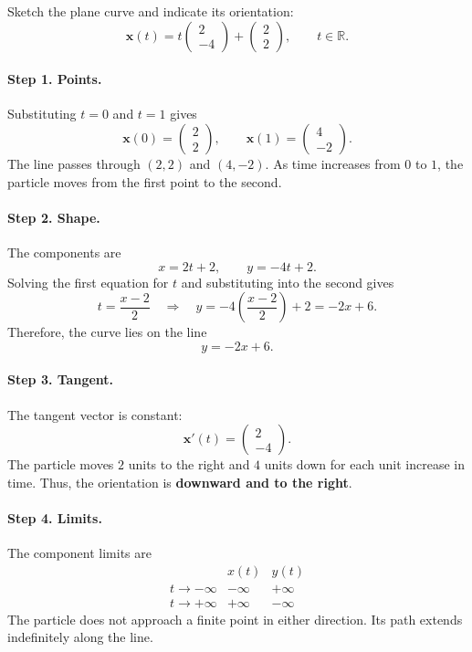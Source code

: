 \documentclass[11pt,letterpaper]{article}
\begin{document}
\begin{example}[3]{
Sketch the plane curve and indicate its orientation:
\[
\mathbf{x}(t)=
t\begin{pmatrix}2\\-4\end{pmatrix}
+\begin{pmatrix}2\\2\end{pmatrix},
\qquad t\in\mathbb R.
\]
}

\paragraph{Step 1. Points.}
Substituting $t=0$ and $t=1$ gives
\[
\mathbf{x}(0)=\begin{pmatrix}2\\2\end{pmatrix},
\qquad
\mathbf{x}(1)=\begin{pmatrix}4\\-2\end{pmatrix}.
\]
The line passes through $(2,2)$ and $(4,-2)$.
As time increases from $0$ to $1$, the particle
moves from the first point to the second.

\paragraph{Step 2. Shape.}
The components are
\[
x=2t+2,\qquad y=-4t+2.
\]
Solving the first equation for $t$ and substituting
into the second gives
\[
t=\frac{x-2}{2}
\quad\Longrightarrow\quad
y=-4\left(\frac{x-2}{2}\right)+2=-2x+6.
\]
Therefore, the curve lies on the line
\[
\boxed{y=-2x+6.}
\]

\paragraph{Step 3. Tangent.}
The tangent vector is constant:
\[
\mathbf{x}'(t)=\begin{pmatrix}2\\-4\end{pmatrix}.
\]
The particle moves $2$ units to the right and $4$ units
down for each unit increase in time. Thus, the
orientation is \textbf{downward and to the right}.

\paragraph{Step 4. Limits.}
The component limits are
\[
\begin{array}{c|cc}
 & x(t) & y(t)\\
\hline
t\to-\infty & -\infty & +\infty\\
t\to+\infty & +\infty & -\infty
\end{array}
\]
The particle does not approach a finite point in
either direction. Its path extends indefinitely
along the line.


\end{example}
\end{document}
